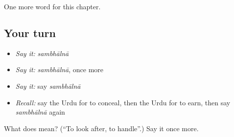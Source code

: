 \begin{grammarlens}[title={What you've built}]
One more word for this chapter.
\end{grammarlens}

\subsection*{Your turn}
\begin{itemize}
\raggedright
  \item \emph{Say it:} \emph{sambhālnā}
  \item \emph{Say it:} \emph{sambhālnā}, once more
  \item \emph{Say it:} say \emph{sambhālnā}
  \item \emph{Recall:} say the Urdu for to conceal, then the Urdu for to earn, then say \emph{sambhālnā} again
\end{itemize}

\begin{tcolorbox}[breakable,colback=teal!4,colframe=teal!35!black,title={Before you move on}]
What does  mean? (\textquotedblleft{}To look after, to handle\textquotedblright{}.) Say it once more.
\end{tcolorbox}
